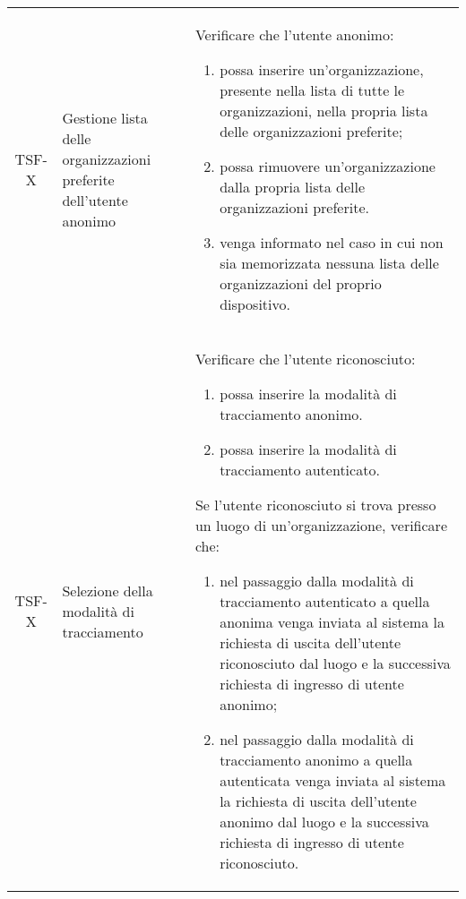 {\begin{longtable}{ c | C{3cm} | C{11cm} }
TSF-X & Gestione lista delle organizzazioni preferite dell'utente anonimo &
Verificare che l'utente anonimo:
\begin{enumerate}
    \item possa inserire un'organizzazione, presente nella lista di tutte le organizzazioni, nella propria lista delle organizzazioni preferite;
    \item possa rimuovere un'organizzazione dalla propria lista delle organizzazioni preferite.
    \item venga informato nel caso in cui non sia memorizzata nessuna lista delle organizzazioni del proprio dispositivo.
\end{enumerate} \\

TSF-X & Selezione della modalità di tracciamento & 
Verificare che l'utente riconosciuto:
\begin{enumerate}
    \item possa inserire la modalità di tracciamento anonimo.
    \item possa inserire la modalità di tracciamento autenticato.
\end{enumerate}
Se l'utente riconosciuto si trova presso un luogo di un'organizzazione, verificare che:
\begin{enumerate}
    \item nel passaggio dalla modalità di tracciamento autenticato a quella anonima venga inviata al sistema la richiesta di uscita dell'utente riconosciuto dal luogo e la successiva richiesta di ingresso di utente anonimo;
    \item nel passaggio dalla modalità di tracciamento anonimo a quella autenticata venga inviata al sistema la richiesta di uscita dell'utente anonimo dal luogo e la successiva richiesta di ingresso di utente riconosciuto.
\end{enumerate} \\


\end{longtable}}

